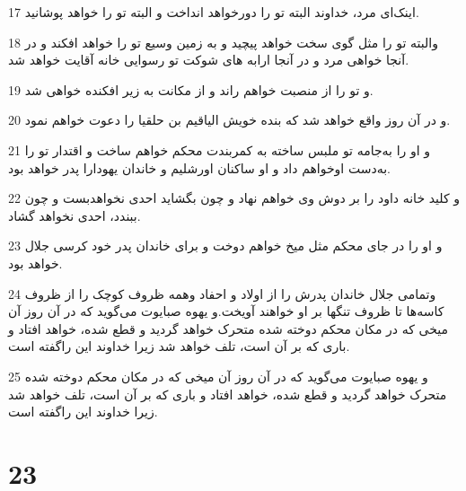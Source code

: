 \par 17 اینک‌ای مرد، خداوند البته تو را دورخواهد انداخت و البته تو را خواهد پوشانید.
\par 18 والبته تو را مثل گوی سخت خواهد پیچید و به زمین وسیع تو را خواهد افکند و در آنجا خواهی مرد و در آنجا ارابه های شوکت تو رسوایی خانه آقایت خواهد شد.
\par 19 و تو را از منصبت خواهم راند و از مکانت به زیر افکنده خواهی شد.
\par 20 و در آن روز واقع خواهد شد که بنده خویش الیاقیم بن حلقیا را دعوت خواهم نمود.
\par 21 و او را به‌جامه تو ملبس ساخته به کمربندت محکم خواهم ساخت و اقتدار تو را به‌دست اوخواهم داد و او ساکنان اورشلیم و خاندان یهودارا پدر خواهد بود.
\par 22 و کلید خانه داود را بر دوش وی خواهم نهاد و چون بگشاید احدی نخواهدبست و چون ببندد، احدی نخواهد گشاد.
\par 23 و او را در جای محکم مثل میخ خواهم دوخت و برای خاندان پدر خود کرسی جلال خواهد بود.
\par 24 وتمامی جلال خاندان پدرش را از اولاد و احفاد وهمه ظروف کوچک را از ظروف کاسه‌ها تا ظروف تنگها بر او خواهند آویخت.و یهوه صبایوت می‌گوید که در آن روز آن میخی که در مکان محکم دوخته شده متحرک خواهد گردید و قطع شده، خواهد افتاد و باری که بر آن است، تلف خواهد شد زیرا خداوند این راگفته است.
\par 25 و یهوه صبایوت می‌گوید که در آن روز آن میخی که در مکان محکم دوخته شده متحرک خواهد گردید و قطع شده، خواهد افتاد و باری که بر آن است، تلف خواهد شد زیرا خداوند این راگفته است.
 
\chapter{23}

